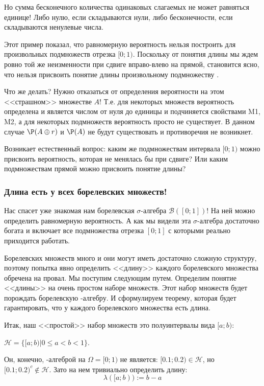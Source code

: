 {Но сумма бесконечного количества одинаковых слагаемых не может равняться единице! Либо нулю, если складываются нули, либо бесконечности, если складываются ненулевые числа.

Этот пример показал, что равномерную вероятность нельзя построить для произвольных подмножеств отрезка $[0;1)$. Поскольку от понятия длины мы ждем ровно той же неизменности при сдвиге вправо-влево на прямой, становится ясно, что нельзя присвоить понятие длины произвольному подмножеству \R.

Что же делать? Нужно отказаться от определения вероятности на этом <<страшном>> множестве $A$! Т.е. для некоторых множеств вероятность определена и является числом от нуля до единицы и подчиняется свойствами M1, M2, а для некоторых подмножеств вероятность просто не существует. В данном случае $\P(A\oplus r)$ и $\P(A)$ не будут существовать и противоречия не возникнет.

Возникает естественный вопрос: каким же подмножествам интервала $[0;1)$ можно присвоить вероятность, которая не менялась бы при сдвиге? Или каким подмножествам прямой можно присвоить понятие длины?

\subsubsection*{Длина есть у всех борелевских множеств!}

Нас спасет уже знакомая нам борелевская $\sigma$-алгебра $\mathcal{B}([0;1])$! На ней можно определить равномерную вероятность. А как мы видели эта $\sigma$-алгебра достаточно богата и включает все подмножества отрезка $[0;1]$ с которыми реально приходится работать.

Борелевских множеств много и они могут иметь достаточно сложную структуру, поэтому попытка явно определить <<длину>> каждого борелевского множества обречена на провал. Мы поступим следующим путем. Определим понятие <<длины>> на очень простом наборе множеств. Этот набор множеств будет порождать борелевскую \s-алгебру. И сформулируем теорему, которая будет гарантировать, что у каждого борелевского множества есть длина.

Итак, наш <<простой>> набор множеств это полуинтервалы вида $[a;b)$:

$\mathcal{H}=\{[a;b)|0\leq a<b<1\}$.

Он, конечно, \s-алгеброй на $\Omega=[0;1)$ не является: $[0.1;0.2)\in \mathcal{H}$, но $[0.1;0.2)^{c}\notin\mathcal{H}$. Зато на нем тривиально определить длину:
\begin{equation}
\lambda([a;b)):=b-a
\end{equation}

}
